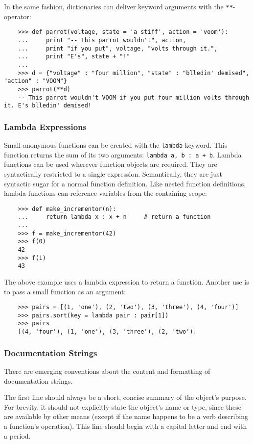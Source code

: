 \documentclass[UTF8]{article}
\begin{document}
In the same fashion, dictionaries can deliver keyword arguments with the \texttt{**}-operator:
\begin{verbatim}
    >>> def parrot(voltage, state = 'a stiff', action = 'voom'):
    ...     print "-- This parrot wouldn't", action,
    ...     print "if you put", voltage, "volts through it.",
    ...     print "E's", state + "!"
    ...
    >>> d = {"voltage" : "four million", "state" : "blledin' demised", "action" : "VOOM"}
    >>> parrot(**d)
    -- This parrot wouldn't VOOM if you put four million volts through it. E's blledin' demised!
\end{verbatim}

\subsubsection{Lambda Expressions}
Small anonymous functions can be created with the \texttt{lambda} keyword. This function returns
the sum of its two arguments: \texttt{lambda a, b : a + b}. Lambda functions can be
used wherever function objects are required. They are syntactically restricted to a single
expression. Semantically, they are just syntactic sugar for a normal function definition. Like
nested function definitions, lambda functions can reference variables from the containing scope:
\begin{verbatim}
    >>> def make_incrementor(n):
    ...     return lambda x : x + n     # return a function
    ...
    >>> f = make_incrementor(42)
    >>> f(0)
    42
    >>> f(1)
    43
\end{verbatim}

The above example uses a lambda expression to return a function. Another use is to pass a small
function as an argument:
\begin{verbatim}
    >>> pairs = [(1, 'one'), (2, 'two'), (3, 'three'), (4, 'four')]
    >>> pairs.sort(key = lambda pair : pair[1])
    >>> pairs
    [(4, 'four'), (1, 'one'), (3, 'three'), (2, 'two')]
\end{verbatim}

\subsubsection{Documentation Strings}
There are emerging conventions about the content and formatting of documentation strings.

The first line should always be a short, concise summary of the object's purpose. For brevity, it
should not explicitly state the object's name or type, since these are available by other means
(except if the name happens to be a verb describing a function's operation). This line should begin
with a capital letter and end with a period.
\end{document}
